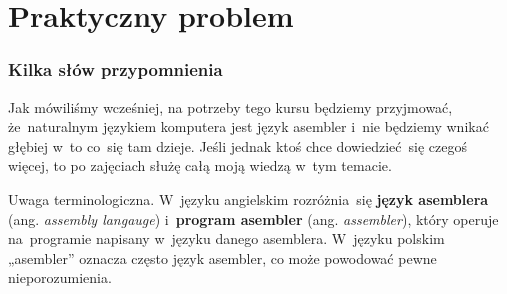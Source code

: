 \documentclass[10pt,t]{beamer}
\begin{document}




















\section{Praktyczny problem}



\begin{frame}
  \frametitle{Kilka słów przypomnienia}


  Jak mówiliśmy wcześniej, na potrzeby tego kursu będziemy przyjmować,
  że~naturalnym językiem komputera jest język asembler i~nie będziemy
  wnikać głębiej w~to co~się tam dzieje. Jeśli jednak ktoś chce
  dowiedzieć~się czegoś więcej, to po zajęciach służę całą moją wiedzą w~tym
  temacie.

  \alert{Uwaga terminologiczna.} W~języku angielskim rozróżnia~się
  \textbf{język asemblera} (ang. \textit{assembly langauge})
  i~\textbf{program asembler} (ang. \textit{assembler}), który operuje
  na~programie napisany w~języku danego asemblera. W~języku polskim
  „asembler” oznacza często język asembler, co może powodować pewne
  nieporozumienia.

\end{frame}
\end{document}
